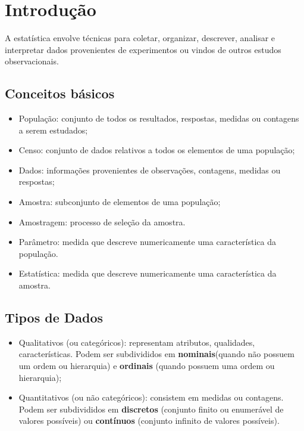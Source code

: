 \chapter{Introdução}

A estatística envolve técnicas para coletar, organizar,
descrever, analisar e interpretar dados provenientes de
experimentos ou vindos de outros estudos
observacionais.

\section{Conceitos básicos}

\begin{itemize}
	\item População: conjunto de todos os resultados, respostas, medidas ou contagens a serem estudados;
	\item Censo: conjunto de dados relativos a todos os elementos de uma população;
	\item Dados: informações provenientes de observações, contagens, medidas ou respostas;
	\item Amostra: subconjunto de elementos de uma população;
	\item Amostragem: processo de seleção da amostra.
	\item Parâmetro: medida que descreve numericamente uma característica da população.
	\item Estatística: medida que descreve numericamente uma característica da amostra.
\end{itemize}

\section{Tipos de Dados}

\begin{itemize}
	\item Qualitativos (ou categóricos): representam atributos, qualidades, características. Podem ser subdivididos em \textbf{nominais}(quando não possuem um ordem ou hierarquia) e \textbf{ordinais} (quando possuem uma ordem ou hierarquia);
	\item Quantitativos (ou não categóricos): consistem em medidas ou contagens. Podem ser subdivididos em \textbf{discretos} (conjunto finito ou enumerável de valores possíveis) ou \textbf{contínuos} (conjunto infinito de valores possíveis).
\end{itemize}